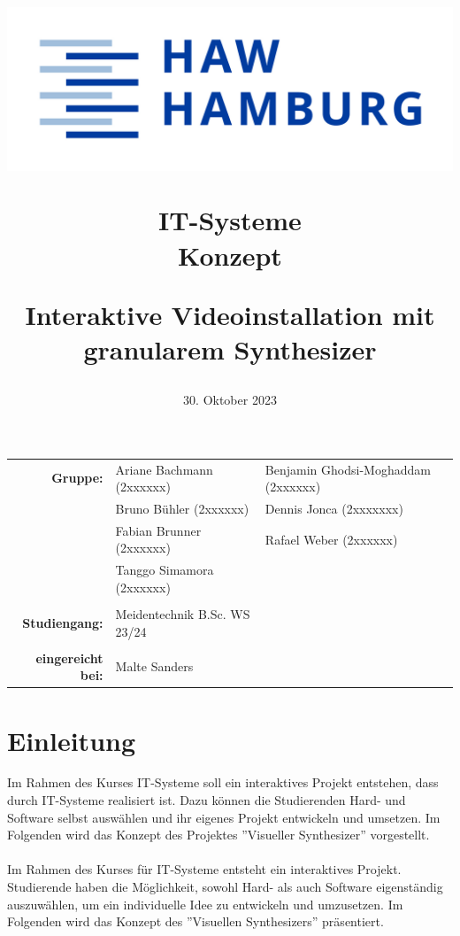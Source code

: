 \documentclass[12pt]{scrartcl}%
\title{
\begin{flushright}
 \includegraphics[scale=0.5]{HAW_Marke_RGB_300dpi.jpg}
\end{flushright}

\vspace{3cm}

IT-Systeme\\
Konzept
 
\vspace{3cm}

\LARGE Interaktive Videoinstallation mit\\
granularem Synthesizer
}
\date{30.  Oktober 2023} %
\theoremstyle{nonumberplain}
\begin{document}
\begin{titlepage}


\maketitle %


\vfill 

\begin{flushleft}
\begin{tabular}{rlll}
\textbf{Gruppe:} & Ariane Bachmann (2xxxxxx) & Benjamin Ghodsi-Moghaddam (2xxxxxx) & \hspace{5cm} \\
 & Bruno Bühler (2xxxxxx) & Dennis Jonca (2xxxxxxx) & \hspace{5cm} \\
 & Fabian Brunner (2xxxxxx) & Rafael Weber (2xxxxxx) & \hspace{5cm} \\
& Tanggo Simamora (2xxxxxx) & & \hspace{5cm} \\\\
\textbf{Studiengang:} & Meidentechnik B.Sc. WS 23/24 & \hspace{5cm} \\\\
\textbf{eingereicht bei:} & Malte Sanders & \hspace{5cm} \\ 
\end{tabular}
\end{flushleft}



\end{titlepage}

\tableofcontents


\newpage

\section{Einleitung}

Im Rahmen des Kurses IT-Systeme soll ein interaktives Projekt entstehen, dass durch IT-Systeme realisiert ist. Dazu können die Studierenden Hard- und Software selbst auswählen und ihr eigenes Projekt entwickeln und umsetzen. Im Folgenden wird das Konzept des Projektes ''Visueller Synthesizer'' vorgestellt.\\\\
Im Rahmen des Kurses für IT-Systeme entsteht ein interaktives Projekt. Studierende haben die Möglichkeit, sowohl Hard- als auch Software eigenständig auszuwählen, um ein individuelle Idee zu entwickeln und umzusetzen. Im Folgenden wird das Konzept des ''Visuellen Synthesizers'' präsentiert.
\end{document}
